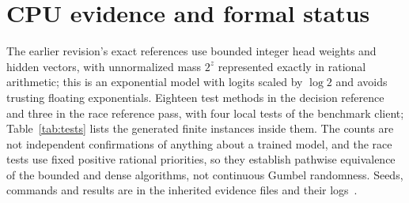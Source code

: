 \section{CPU evidence and formal status}\label{app:cpu}
The earlier revision's exact references use bounded integer head weights and hidden vectors, with unnormalized mass $2^z$ represented exactly in rational arithmetic; this is an exponential model with logits scaled by $\log2$ and avoids trusting floating exponentials. Eighteen test methods in the decision reference and three in the race reference pass, with four local tests of the benchmark client; Table~\ref{tab:tests} lists the generated finite instances inside them. The counts are not independent confirmations of anything about a trained model, and the race tests use fixed positive rational priorities, so they establish pathwise equivalence of the bounded and dense algorithms, not continuous Gumbel randomness. Seeds, commands and results are in the inherited evidence files and their logs~.

